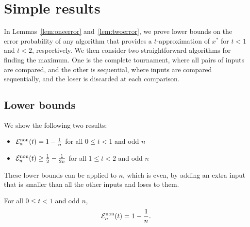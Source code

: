 \documentclass[twoside,11pt]{article}
\newcommand{\cE}{\mathcal{E}}
\newcommand{\maxx}{x^*}
\newcommand{\pe}{\cE}
\newcommand{\nonadaptive}{\textnormal{non}}
\begin{document}
\section{Simple results}
\label{sec:simple-results}
In Lemmas~\ref{lem:oneerror} and~\ref{lem:twoerror}, we prove lower
bounds on the error probability of any algorithm that provides a
$t$-approximation of $\maxx$ for $t<1$ and $t<2$, respectively.  We
then consider two straightforward algorithms
for finding the maximum. One is the complete tournament, where all
pairs of inputs are compared, and the other is sequential, where inputs are compared sequentially, and the loser is
discarded at each comparison.

\subsection{Lower bounds}
\label{subsec:lowerbound}
We show the following two results:
\begin{itemize}
\item $\pe_n^{\nonadaptive}(t) = 1-\frac1{n}$ for all $0\le t<1$ and odd $n$
\item $\pe_n^{\nonadaptive}(t)\ge \frac12-\frac1{2n}$ for all $1\le t<2$ and odd $n$
\end{itemize}
These lower bounds can be applied to $n$, which is even, by adding an
extra input that is smaller than all the other inputs and loses to them. 
\begin{lemma}
 \label{lem:oneerror}
For all $0 \le t<1$ and odd $n$,
 $$\pe_n^{\nonadaptive}(t) =  1-\frac1n.$$
\end{lemma}
\end{document}

